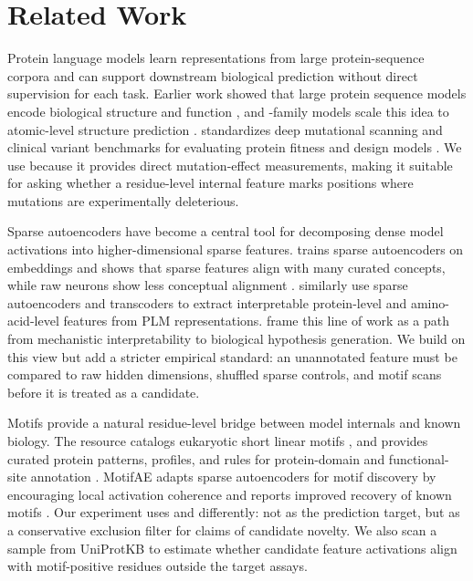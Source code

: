 \section{Related Work}
\label{sec:related}

 Protein language models learn representations from large protein-sequence corpora and can support downstream biological prediction without direct supervision for each task. Earlier work showed that large protein sequence models encode biological structure and function \cite{rives2021biological}, and \esm-family models scale this idea to atomic-level structure prediction \cite{lin2023evolutionary}. \proteingym standardizes deep mutational scanning and clinical variant benchmarks for evaluating protein fitness and design models \cite{notin2023proteingym}. We use \proteingym because it provides direct mutation-effect measurements, making it suitable for asking whether a residue-level internal feature marks positions where mutations are experimentally deleterious.

 Sparse autoencoders have become a central tool for decomposing dense model activations into higher-dimensional sparse features. \interplm trains sparse autoencoders on \esm embeddings and shows that sparse features align with many curated concepts, while raw neurons show less conceptual alignment \cite{simon2025interplm}. \citet{gujral2025sparse} similarly use sparse autoencoders and transcoders to extract interpretable protein-level and amino-acid-level features from PLM representations. \citet{adams2025mechanistic} frame this line of work as a path from mechanistic interpretability to biological hypothesis generation. We build on this view but add a stricter empirical standard: an unannotated feature must be compared to raw hidden dimensions, shuffled sparse controls, and motif scans before it is treated as a candidate.

 Motifs provide a natural residue-level bridge between model internals and known biology. The \elm resource catalogs eukaryotic short linear motifs \cite{kumar2024elm}, and \prosite provides curated protein patterns, profiles, and rules for protein-domain and functional-site annotation \cite{sigrist2013prosite}. MotifAE adapts sparse autoencoders for motif discovery by encouraging local activation coherence and reports improved recovery of known \elm motifs \cite{hou2025motifae}. Our experiment uses \elm and \prosite differently: not as the prediction target, but as a conservative exclusion filter for claims of candidate novelty. We also scan a \swissprot sample from UniProtKB \cite{uniprot2025} to estimate whether candidate feature activations align with motif-positive residues outside the target assays.

